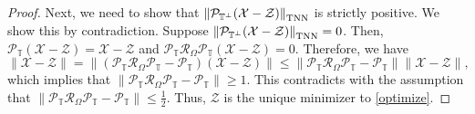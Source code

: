 \documentclass[twoside,12pt]{article}
\newcommand{\TNN}{\textnormal{TNN}}
\begin{document}
\begin{proof}
Next, we need to show that $\left\|\mathcal{P}_{\mathbb{T}^{\perp}}(\mathcal{X}-\mathcal{Z})\right\|_{\TNN}$ is strictly positive. We show this by contradiction. 
Suppose $\left\|\mathcal{P}_{\mathbb{T}^{\perp}}(\mathcal{X}-\mathcal{Z})\right\|_{\TNN} = 0$. Then, 
$\mathcal{P}_{\mathbb{T}}(\mathcal{X}-\mathcal{Z}) = \mathcal{X}-\mathcal{Z}$ and $\mathcal{P}_{\mathbb{T}}\mathcal{R}_{\Omega}\mathcal{P}_{\mathbb{T}}(\mathcal{X}-\mathcal{Z}) = 0$. Therefore, we have \[\|\mathcal{X}-\mathcal{Z}\|=\|(\mathcal{P}_{\mathbb{T}}\mathcal{R}_{\Omega}\mathcal{P}_{\mathbb{T}}-\mathcal{P}_{\mathbb{T}})(\mathcal{X}-\mathcal{Z})\|\leq \|\mathcal{P}_{\mathbb{T}}\mathcal{R}_{\Omega}\mathcal{P}_{\mathbb{T}}-\mathcal{P}_{\mathbb{T}}\|\|\mathcal{X}-\mathcal{Z}\|,\]
which implies that $\|\mathcal{P}_{\mathbb{T}}\mathcal{R}_{\Omega}\mathcal{P}_{\mathbb{T}}-\mathcal{P}_{\mathbb{T}}\|\geq 1$. This   contradicts with the assumption that $\|\mathcal{P}_{\mathbb{T}}\mathcal{R}_{\Omega}\mathcal{P}_{\mathbb{T}}-\mathcal{P}_{\mathbb{T}}\|\leq \frac{1}{2}$.
Thus, $\mathcal{Z}$ is the unique minimizer to  \eqref{optimize}.
\end{proof}
\vspace{-21pt}
\end{document}
